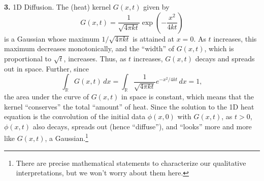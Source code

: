 \documentclass[11pt]{article}
\newcommand{\f}[2]{\frac{#1}{#2}}
\begin{document}
\noindent \textbf{3.} 1D Diffusion. The (heat) kernel $G(x,t)$ given by 
\begin{equation*}
G(x,t) = \f{1}{\sqrt{4\pi kt}} \exp\left( -\f{x^2}{4kt} \right)
\end{equation*}
is a Gaussian whose maximum $1/\sqrt{4\pi k t}$ is attained at $x=0$. As $t$ increases, this maximum decreases monotonically, and the ``width'' of $G(x,t)$, which is proportional to $\sqrt{t}$, increases. Thus, as $t$ increases, $G(x,t)$ decays and spreads out in space. Further, since
\begin{equation*}
\int_{\mathbb{R}} G(x,t)\,dx= \int_{\mathbb{R}} \f{1}{\sqrt{4\pi kt}} e^{-x^2/4kt}  \,dx = 1,
\end{equation*}
the area under the curve of $G(x,t)$ in space is constant, which means that the kernel ``conserves'' the total ``amount'' of heat. Since the solution to the 1D heat equation is the convolution of the initial data $\phi(x,0)$ with $G(x,t)$, as $t > 0$, $\phi(x,t)$ also decays, spreads out (hence ``diffuse''), and ``looks'' more and more like $G(x,t)$, a Gaussian.\footnote{There are precise mathematical statements to characterize our qualitative interpretations, but we won't worry about them here.}

  
\end{document}
